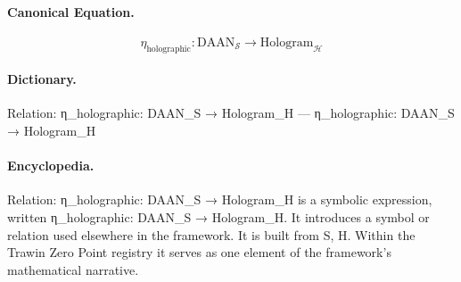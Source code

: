 \paragraph{Canonical Equation.}
\[
\eta_{\text{holographic}}: \text{DAAN}_{\mathcal{S}} \to \text{Hologram}_{\mathcal{H}}
\]

\paragraph{Dictionary.}
Relation: η\_holographic: DAAN\_S → Hologram\_H — η\_holographic: DAAN\_S → Hologram\_H

\paragraph{Encyclopedia.}
Relation: η\_holographic: DAAN\_S → Hologram\_H is a symbolic expression, written η\_holographic: DAAN\_S → Hologram\_H. It introduces a symbol or relation used elsewhere in the framework. It is built from S, H. Within the Trawin Zero Point registry it serves as one element of the framework's mathematical narrative.
